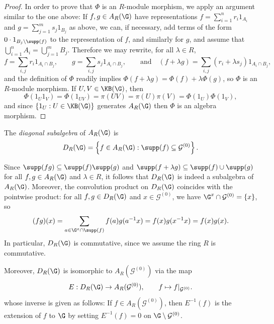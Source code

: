 \begin{proof}
In order to prove that $\Phi$ is an $R$-module morphism, we apply an argument similar to the one above: If $f,g\in A_R(\G)$ have representations $f=\sum_{i=1}^n r_i 1_{A_i}$ and $g=\sum_{j=1}^m s_j 1_{B_j}$ as above, we can, if necessary, add terms of the form $0\cdot 1_{B_j\setminus\supp(f)}$ to the representation of $f$, and similarly for $g$, and assume that $\bigcup_{i=1}^n A_i=\bigcup_{j=1}^m B_j$. Therefore we may rewrite, for all $\lambda\in R$,
\[f=\sum_{i,j}r_i1_{A_i\cap B_j},\qquad g=\sum_{i,j}s_j1_{A_i\cap B_j},\qquad\text{and}\quad(f+\lambda g)=\sum_{i,j}(r_i+\lambda s_j)1_{A_i\cap B_j},\]
and the definition of $\Phi$ readily implies $\Phi(f+\lambda g)=\Phi(f)+\lambda\Phi(g)$, %
so $\Phi$ is an $R$-module morphism. If $U,V\in\KB(\G)$, then
\[\Phi(1_U1_V)=\Phi(1_{UV})=\pi(UV)=\pi(U)\pi(V)=\Phi(1_U)\Phi(1_V),\]
and since $\left\{1_U:U\in\KB(\G)\right\}$ generates $A_R(\G)$ then $\Phi$ is an algebra morphism.\qedhere
\end{proof}

\begin{definition}\label{definitiondiagonalsteinbergalgebra}
The \emph{diagonal subalgebra} of $A_R(\G)$ is
\[D_R(\G)=\left\{f\in A_R(\G):\supp(f)\subseteq\mathcal{G}^{(0)}\right\}.\]
\end{definition}

Since $\supp(fg)\subseteq\supp(f)\supp(g)$ and $\supp(f+\lambda g)\subseteq\supp(f)\cup\supp(g)$ for all $f,g\in A_R(\G)$ and $\lambda\in R$, it follows that $D_R(\G)$ is indeed a subalgebra of $A_R(\G)$. Moreover, the convolution product on $D_R(\G)$ coincides with the pointwise product: for all $f,g\in D_R(\G)$ and $x\in\mathcal{G}^{(0)}$, we have $\G^x\cap\mathcal{G}^{(0)}=\left\{x\right\}$, so
\[(fg)(x)=\sum_{a\in\G^x\cap\supp(f)}f(a)g(a^{-1}x)=f(x)g(x^{-1}x)=f(x)g(x).\]
In particular, $D_R(\G)$ is commutative, since we assume the ring $R$ is commutative.

Moreover, $D_R(\G)$ is isomorphic to $A_R(\mathcal{G}^{(0)})$ via the map
\[E:D_R(\G)\to A_R(\mathcal{G}^{(0)}),\qquad f\mapsto f|_{\mathcal{G}^{(0)}}.\]
whose inverse is given as follows: If $f\in A_R(\mathcal{G}^{(0)})$, then $E^{-1}(f)$ is the extension of $f$ to $\G$ by setting $E^{-1}(f)=0$ on $\G\setminus\mathcal{G}^{(0)}$.

